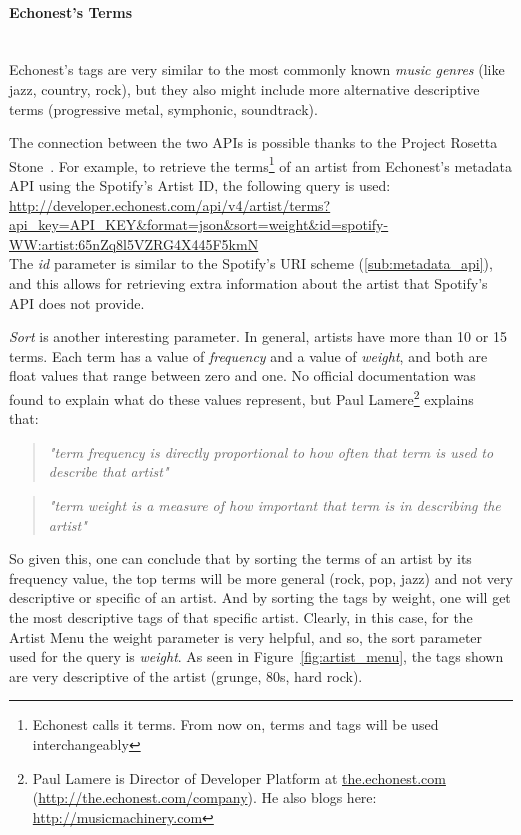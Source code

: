       \paragraph{Echonest's Terms} \hfill \\
      Echonest's tags are very similar to the most commonly known \emph{music genres} (like jazz, country, rock), but they also might include more alternative descriptive terms (progressive metal, symphonic, soundtrack).

      The connection between the two APIs is possible thanks to the Project Rosetta Stone~\cite{rosettastone}.
      For example, to retrieve the terms\footnote{Echonest calls it terms. From now on, terms and tags will be used interchangeably} of an artist from Echonest's metadata API using the Spotify's Artist ID, the following query is used: \\

      \url{
        http://developer.echonest.com/api/v4/artist/terms?api_key=API_KEY&format=json&sort=weight&id=spotify-WW:artist:65nZq8l5VZRG4X445F5kmN
      } \\

      The \emph{id} parameter is similar to the Spotify's URI scheme (\ref{sub:metadata_api}), and this allows for retrieving extra information about the artist that Spotify's API does not provide.

      \emph{Sort} is another interesting parameter. 
      In general, artists have more than 10 or 15 terms.
      Each term has a value of \emph{frequency} and a value of \emph{weight}, and both are float values that range between zero and one.
      No official documentation was found to explain what do these values represent, but Paul Lamere\footnote{Paul Lamere is Director of Developer Platform at \url{the.echonest.com} (\url{http://the.echonest.com/company}). He also blogs here: \url{http://musicmachinery.com}} explains~\cite{lamereterms} that:

      \begin{quote}
      \emph{
        "term frequency is directly proportional to how often that term is used to describe that artist"
      }
      \end{quote}

      \begin{quote}
      \emph{
        "term weight is a measure of how important that term is in describing the artist"
      }
      \end{quote}

      So given this, one can conclude that by sorting the terms of an artist by its frequency value, the top terms will be more general (rock, pop, jazz) and not very descriptive or specific of an artist.
      And by sorting the tags by weight, one will get the most descriptive tags of that specific artist.
      Clearly, in this case, for the Artist Menu the weight parameter is very helpful, and so, the sort parameter used for the query is \emph{weight}.
      As seen in Figure~\ref{fig:artist_menu}, the tags shown are very descriptive of the artist (grunge, 80s, hard rock).

